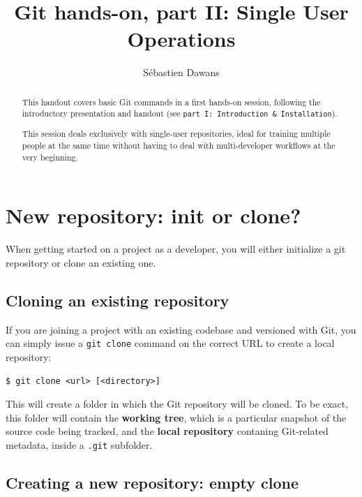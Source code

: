 \documentclass{../../common/tufte-latex/tufte-handout}
\title{Git hands-on, part II: Single User Operations}
\author{S\'ebastien Dawans}
\begin{document}
\maketitle%

\begin{abstract}
\noindent
This handout covers basic Git commands in a first hands-on session, following the introductory presentation and handout (see \texttt{part I: Introduction \& Installation}).

This session deals exclusively with single-user repositories, ideal for training multiple people at the same time without having to deal with multi-developer workflows at the very beginning.
\end{abstract}

\section{New repository: init or clone?}

When getting started on a project as a developer, you will either initialize a git repository or clone an existing one.

\subsection{Cloning an existing repository}

If you are joining a project with an existing codebase and versioned with Git, you can simply issue a \texttt{git clone} command on the correct URL to create a local repository: 

\begin{lstlisting}[style=BashInputStyle]
  $ git clone <url> [<directory>]
\end{lstlisting}

This will create a folder in which the Git repository will be cloned.
To be exact, this folder will contain the \textbf{working tree}, which is a particular snapshot of the source code being tracked, and the \textbf{local repository} contaning Git-related metadata, inside a \texttt{.git} subfolder.

\subsection{Creating a new repository: empty clone}
\end{document}
